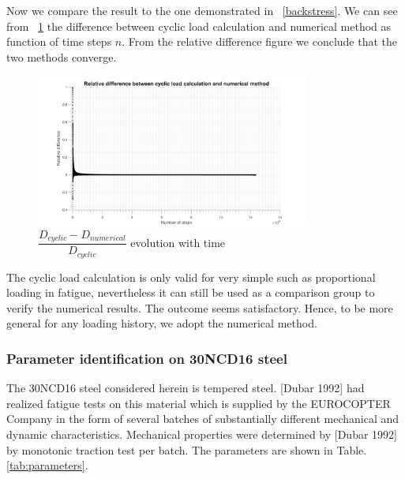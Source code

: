 \documentclass[3p,times,number,review]{elsarticle}
\newcommand{\figref}[1]{\figurename~\ref{#1}}
\begin{document}
Now we compare the result to the one demonstrated in \figref{backstress}.  We can see from \figref{Damagediff}  the difference between cyclic load calculation and numerical method as function of time steps $n$. From the relative difference figure we conclude that the two methods converge.

\begin{figure}[!h]
	\centering
	\includegraphics[width=0.8\textwidth]{figures//Damagediff.png} 
	\caption{$\dfrac{D_{cyclic}-D_{numerical}}{D_{cyclic}}$ evolution with time}
	\label{Damagediff}
\end{figure}

The cyclic load calculation is only valid for very simple such as proportional loading in fatigue, nevertheless it can still be used as a comparison group to verify the numerical results. The outcome seems satisfactory. Hence, to be more general for any loading history, we adopt the numerical method.

\newpage
\subsubsection{Parameter identification on 30NCD16 steel}
The 30NCD16 steel considered herein is tempered steel. [Dubar 1992] had realized
fatigue tests on this material which is supplied by the EUROCOPTER Company in the form of
several batches of substantially different mechanical and dynamic characteristics. Mechanical properties were determined by [Dubar 1992] by monotonic traction test per batch. The parameters are shown in Table.\ref{tab:parameters}.
\end{document}
